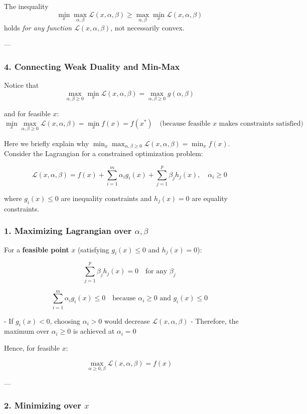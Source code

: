 The inequality
\[
\min_x \max_{\alpha,\beta} \mathcal{L}(x,\alpha,\beta) \ge \max_{\alpha,\beta} \min_x \mathcal{L}(x,\alpha,\beta)
\]
holds \emph{for any function \(\mathcal{L}(x,\alpha,\beta)\)}, not necessarily convex.  

---

\subsubsection*{4. Connecting Weak Duality and Min-Max}

Notice that
\[
\max_{\alpha,\beta \ge 0} \min_x \mathcal{L}(x,\alpha,\beta) = \max_{\alpha,\beta \ge 0} g(\alpha,\beta)
\]

and for feasible \(x\):
\[
\min_x \max_{\alpha,\beta \ge 0} \mathcal{L}(x,\alpha,\beta) = \min_x f(x) = f(x^*) \quad \text{(because feasible \(x\) makes constraints satisfied)}
\]

Here we briefly explain why \(\min _x \max _{ \alpha , \beta \ge 0 } \mathcal{L} (x, \alpha , \beta ) = \min _x f(x) \).  Consider the Lagrangian for a constrained optimization problem:

\[
\mathcal{L}(x, \alpha, \beta) = f(x) + \sum_{i=1}^m \alpha_i g_i(x) + \sum_{j=1}^p \beta_j h_j(x), \quad \alpha_i \ge 0
\]

where \(g_i(x) \le 0\) are inequality constraints and \(h_j(x) = 0\) are equality constraints.

\subsubsection*{1. Maximizing Lagrangian over $\alpha, \beta$}

For a \textbf{feasible point} \(x\) (satisfying \(g_i(x) \le 0\) and \(h_j(x) = 0\)):

\[
\sum_{j=1}^p \beta_j h_j(x) = 0 \quad \text{for any } \beta_j
\]

\[
\sum_{i=1}^m \alpha_i g_i(x) \le 0 \quad \text{because } \alpha_i \ge 0 \text{ and } g_i(x) \le 0
\]

- If \(g_i(x) < 0\), choosing \(\alpha_i > 0\) would decrease \(\mathcal{L}(x,\alpha,\beta)\)  
- Therefore, the maximum over \(\alpha_i \ge 0\) is achieved at \(\alpha_i = 0\)  

Hence, for feasible \(x\):

\[
\max_{\alpha \ge 0, \beta} \mathcal{L}(x, \alpha, \beta) = f(x)
\]

---

\subsubsection*{2. Minimizing over $x$}

